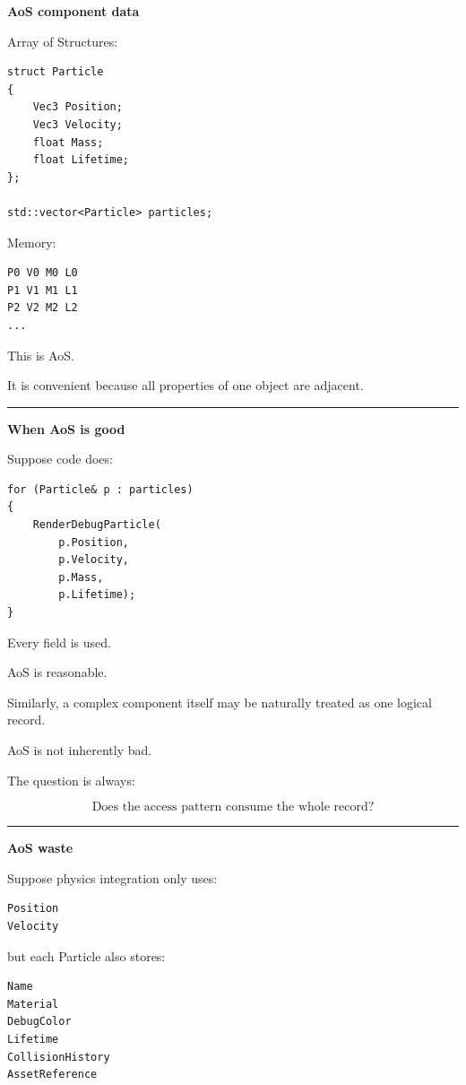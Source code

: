 \textbf{AoS component data}

Array of Structures:

\begin{verbatim}
struct Particle
{
    Vec3 Position;
    Vec3 Velocity;
    float Mass;
    float Lifetime;
};

std::vector<Particle> particles;
\end{verbatim}

Memory:

\begin{verbatim}
P0 V0 M0 L0
P1 V1 M1 L1
P2 V2 M2 L2
...
\end{verbatim}

This is AoS.

It is convenient because all properties of one object are adjacent.

\begin{center}\rule{0.5\linewidth}{0.5pt}\end{center}

\textbf{When AoS is good}

Suppose code does:

\begin{verbatim}
for (Particle& p : particles)
{
    RenderDebugParticle(
        p.Position,
        p.Velocity,
        p.Mass,
        p.Lifetime);
}
\end{verbatim}

Every field is used.

AoS is reasonable.

Similarly, a complex component itself may be naturally treated as one logical record.

AoS is not inherently bad.

The question is always:

\[
\boxed{
\text{Does the access pattern consume the whole record?}
}
\]

\begin{center}\rule{0.5\linewidth}{0.5pt}\end{center}

\textbf{AoS waste}

Suppose physics integration only uses:

\begin{verbatim}
Position
Velocity
\end{verbatim}

but each Particle also stores:

\begin{verbatim}
Name
Material
DebugColor
Lifetime
CollisionHistory
AssetReference
\end{verbatim}

